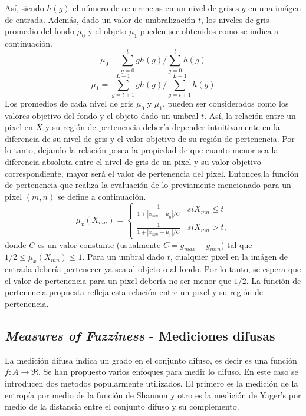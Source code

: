 \documentclass[preprint,12pt]{elsarticle}
\begin{document}
Así, siendo $h(g)$ el número de ocurrencias en un nivel de grises $g$ en una imágen de entrada.
%
Además, dado un valor de umbralización $t$, los niveles de gris promedio del fondo $\mu_0$ y el objeto $\mu_1$ pueden ser obtenidos como se indica a continuación.
%
\begin{equation}
    \mu_0 =  \sum_{g=0}^t g h(g) / \sum_{g=0}^t h(g)
\end{equation}
\begin{equation}
    \mu_1 =  \sum_{g=t+1}^{L-1} g h(g) / \sum_{g=t+1}^{L-1} h(g)
\end{equation}
%
Los promedios de cada nivel de gris $\mu_0$ y $\mu_1$, pueden ser considerados como los valores objetivo del fondo y el objeto dado un umbral $t$.
%
Así, la relación entre un pixel en $X$ y su región de pertenencia debería depender intuitivamente en la diferencia de su  nivel de gris y el valor objetivo de su región de pertenencia.
%
Por lo tanto, dejando la relación posea la propiedad de que cuanto menor sea la diferencia absoluta entre el nivel de gris de un pixel y su valor objetivo correspondiente, mayor será el valor de pertenencia del pixel.
%
Entonces,la función de pertenencia que realiza la evaluación de lo previamente mencionado para un pixel $(m ,n)$ se define a continuación.
%
\begin{equation}
\mu_x(X_{mn}) =
     \begin{cases}
             \frac{1}{1+|x_{mn} - \mu_0|/C} & si X_{mn} \leq t\\
             \frac{1}{1+|x_{mn} - \mu_1|/C} & si X_{mn} > t,
            
     \end{cases}
\end{equation}
donde $C$ es un valor constante (usualmente $C=g_{max} - g_{min}$) tal que $1/2 \leq \mu_x(X_{mn}) \leq 1$.
%
Para un umbral dado $t$, cualquier pixel en la imágen de entrada debería pertenecer ya sea al objeto o al fondo.
%
Por lo tanto, se espera que el valor de pertenencia para un pixel debería no ser menor que $1/2$.
%
La función de pertenencia propuesta refleja esta relación entre  un pixel y su región de pertenencia.
%
\subsection{\textit{Measures of Fuzziness} - Mediciones difusas}
La medición difusa indica un grado en el conjunto difuso, es decir es una función $f: A\longrightarrow\Re$.
%
Se han propuesto varios enfoques para medir lo difuso.
%
En este caso se introducen dos metodos popularmente utilizados.
%
El primero es la medición de la entropía por medio de la función de Shannon y otro es la medición de Yager's por medio de la distancia entre el conjunto difuso y su complemento.
%
\end{document}
